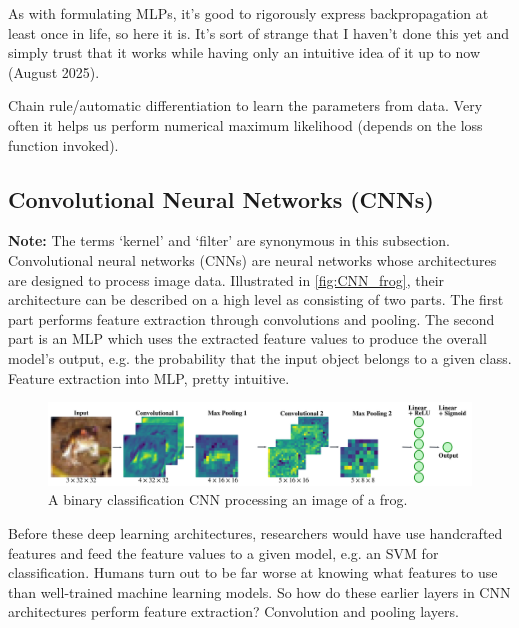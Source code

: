 \documentclass[11pt]{article}
\begin{document}
As with formulating MLPs, it's good to rigorously express backpropagation at least once in life, so here it is. It's sort of strange that I haven't done this yet and simply trust that it works while having only an intuitive idea of it up to now (August 2025).

Chain rule/automatic differentiation to learn the parameters from data. Very often it helps us perform numerical maximum likelihood (depends on the loss function invoked).

\subsection{Convolutional Neural Networks (CNNs)}
\label{subsec:conv_neural_networks}

\textbf{Note:} The terms `kernel' and `filter' are synonymous in this subsection.\\

\noindent Convolutional neural networks (CNNs) are neural networks whose architectures are designed to process image data. Illustrated in \autoref{fig:CNN_frog}, their architecture can be described on a high level as consisting of two parts. The first part performs feature extraction through convolutions and pooling. The second part is an MLP which uses the extracted feature values to produce the overall model's output, e.g. the probability that the input object belongs to a given class. Feature extraction into MLP, pretty intuitive.

\begin{figure}[ht]
    \centering
    \includegraphics[width=1\textwidth]{./figures/neural_nets/CNN_frog.pdf}
    \caption{A binary classification CNN processing an image of a frog.}
    \label{fig:CNN_frog}
\end{figure}

Before these deep learning architectures, researchers would have use handcrafted features and feed the feature values to a given model, e.g. an SVM for classification. Humans turn out to be far worse at knowing what features to use than well-trained machine learning models. So how do these earlier layers in CNN architectures perform feature extraction? Convolution and pooling layers.
\end{document}
